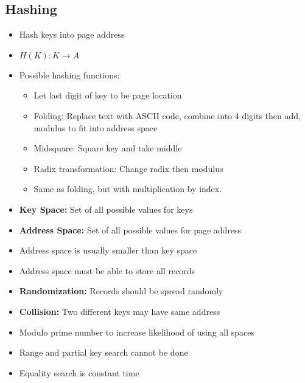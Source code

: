 \documentclass[landscape, letterpaper]{extarticle}
\begin{document}
\begin{multicols}{3}
    \subsection*{Hashing}
    \begin{itemize}[noitemsep,nolistsep]
        \item Hash keys into page address
        \item \(H(K): K \rightarrow A\)
        \item Possible hashing functions:
              \begin{itemize}[noitemsep,nolistsep]
                  \item Let last digit of key to be page location
                  \item Folding: Replace text with ASCII code, combine into 4 digits then add, modulus to fit into address space
                  \item Midsquare: Square key and take middle
                  \item Radix transformation: Change radix then modulus
                  \item Same as folding, but with multiplication by index.
              \end{itemize}
        \item \textbf{Key Space:} Set of all possible values for keys
        \item \textbf{Address Space:} Set of all possible values for page address
        \item Address space is usually smaller than key space
        \item Address space must be able to store all records
        \item \textbf{Randomization:} Records should be spread randomly
        \item \textbf{Collision:} Two different keys may have same address
        \item Modulo prime number to increase likelihood of using all spaces
        \item Range and partial key search cannot be done
        \item Equality search is constant time
    \end{itemize}

\end{multicols}
\end{document}
